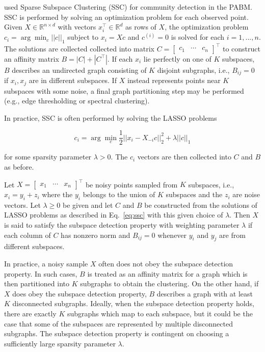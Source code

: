 \documentclass[12pt]{article}
\begin{document}
\citet*{noroozi2019estimation} used Sparse Subspace Clustering (SSC) for
community detection in the PABM. SSC is performed by solving an
optimization problem for each observed point. Given
\(X \in \mathbb{R}^{n \times d}\) with vectors
\(x_i^\top \in \mathbb{R}^d\) as rows of \(X\), the optimization problem
\(c_i = \arg\min_{c} ||c||_1\) subject to \(x_i = X c\) and
\(c^{(i)} = 0\) is solved for each \(i = 1, ..., n\). The solutions are
collected collected into matrix
\(C = \begin{bmatrix} c_1 & \cdots & c_n \end{bmatrix}^\top\) to
construct an affinity matrix \(B = |C| + |C^\top|\). If each \(x_i\) lie
perfectly on one of \(K\) subspaces, \(B\) describes an undirected graph
consisting of \(K\) disjoint subgraphs, i.e., \(B_{ij} = 0\) if
\(x_i, x_j\) are in different subspaces. If \(X\) instead represents
points near \(K\) subspaces with some noise, a final graph partitioning
step may be performed (e.g., edge thresholding or spectral clustering).

In practice, SSC is often performed by solving the LASSO problems

\begin{equation} \label{eq:ssc}
c_i = \arg\min_c \frac{1}{2} ||x_i - X_{-i} c||^2_2 + \lambda ||c||_1
\end{equation}

for some sparsity parameter \(\lambda > 0\). The \(c_i\) vectors are
then collected into \(C\) and \(B\) as before.

\begin{definition}
  \label{def:subspace_detection}
Let $X = \begin{bmatrix} x_1 & \cdots & x_n \end{bmatrix}^\top$ be noisy
points sampled from $K$ subspaces, i.e., $x_i = y_i + z_i$ where the
$y_i$ belongs to the union of $K$ subspaces and the $z_i$ are noise
vectors. Let $\lambda \geq 0$ be given and
let $C$ and $B$
be constructed from the
solutions of LASSO problems as described in Eq.~\eqref{eq:ssc} with
this given choice of $\lambda$. Then $X$
is said to satisfy the subspace detection property with weighting parameter $\lambda$ if each column of
$C$ has nonzero norm and $B_{ij} = 0$ whenever $y_i$ and $y_j$ are
from different subspaces.
\end{definition}

\begin{remark}
In practice, a noisy sample $X$ often does not obey the subspace detection
property. In such cases, $B$ is treated as an affinity matrix for a graph which
is then partitioned into $K$ subgraphs to obtain the clustering. On the other
hand, if $X$ does obey the subspace detection property, $B$ describes a graph
with at least $K$ disconnected subgraphs. Ideally, when the subspace detection
property holds, there are exactly $K$ subgraphs which map to each subspace,
but it could be the case that some of the subspaces are represented by
multiple disconnected subgraphs. The subspace detection property is contingent
on choosing a sufficiently large sparsity parameter $\lambda$.
\end{remark}
\end{document}
